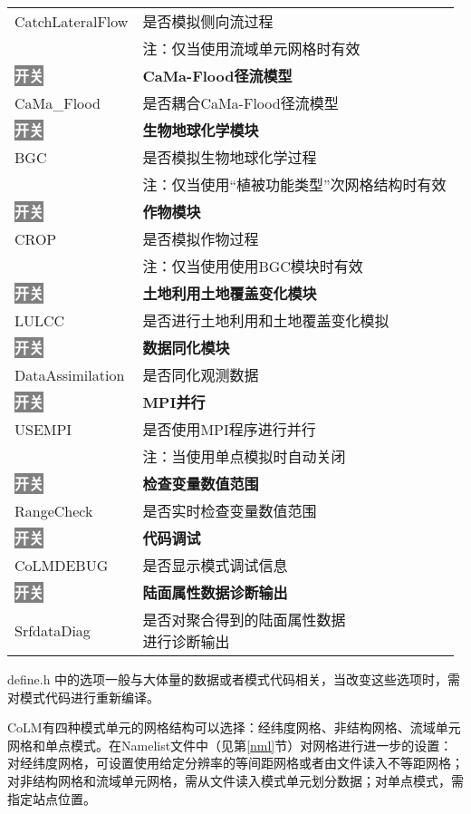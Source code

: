 {\begin{longtable}{ll}
CatchLateralFlow &  是否模拟侧向流过程 \\
 & 注：仅当使用流域单元网格时有效 \\
\hline
\colorbox{gray}{\textcolor{white}{\bf{开关}}} & \bf{CaMa-Flood径流模型} \\
CaMa\_Flood &  是否耦合CaMa-Flood径流模型 \\
\hline
\colorbox{gray}{\textcolor{white}{\bf{开关}}} & \bf{生物地球化学模块} \\
BGC &  是否模拟生物地球化学过程 \\
& 注：仅当使用“植被功能类型”次网格结构时有效 \\
\hline
\colorbox{gray}{\textcolor{white}{\bf{开关}}} & \bf{作物模块} \\
CROP &  是否模拟作物过程 \\
& 注：仅当使用使用BGC模块时有效 \\
\hline
\colorbox{gray}{\textcolor{white}{\bf{开关}}} & \bf{土地利用土地覆盖变化模块} \\
LULCC &  是否进行土地利用和土地覆盖变化模拟 \\
\hline
\colorbox{gray}{\textcolor{white}{\bf{开关}}} & \bf{数据同化模块} \\
DataAssimilation &  是否同化观测数据 \\
\hline
\colorbox{gray}{\textcolor{white}{\bf{开关}}} & \bf{MPI并行} \\
USEMPI &  是否使用MPI程序进行并行 \\
 & 注：当使用单点模拟时自动关闭 \\
\hline
\colorbox{gray}{\textcolor{white}{\bf{开关}}} & \bf{检查变量数值范围} \\
RangeCheck &  是否实时检查变量数值范围 \\
\hline
\colorbox{gray}{\textcolor{white}{\bf{开关}}} & \bf{代码调试} \\
CoLMDEBUG &  是否显示模式调试信息 \\
\hline
\colorbox{gray}{\textcolor{white}{\bf{开关}}} & \bf{陆面属性数据诊断输出} \\
SrfdataDiag &  \makecell[l]{是否对聚合得到的陆面属性数据\\进行诊断输出} \\

\end{longtable}}

define.h 中的选项一般与大体量的数据或者模式代码相关，当改变这些选项时，需对模式代码进行重新编译。

CoLM有四种模式单元的网格结构可以选择：经纬度网格、非结构网格、流域单元网格和单点模式。在Namelist文件中（见第\ref{nml}节）对网格进行进一步的设置：对经纬度网格，可设置使用给定分辨率的等间距网格或者由文件读入不等距网格；对非结构网格和流域单元网格，需从文件读入模式单元划分数据；对单点模式，需指定站点位置。


